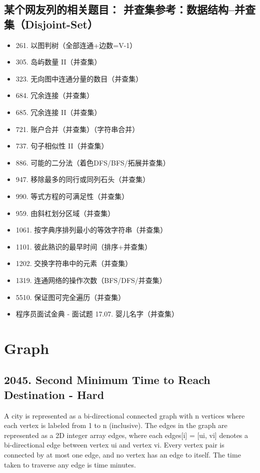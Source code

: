 \documentclass[9pt, b5paaper]{book}
\begin{document}
\section{某个网友列的相关题目： 并查集参考：数据结构–并查集（Disjoint-Set）}
\label{sec-6-9}
\begin{itemize}
\item 261. 以图判树（全部连通+边数=V-1）
\item 305. 岛屿数量 II（并查集）
\item 323. 无向图中连通分量的数目（并查集）
\item 684. 冗余连接（并查集）
\item 685. 冗余连接 II（并查集）
\item 721. 账户合并（并查集）（字符串合并）
\item 737. 句子相似性 II（并查集）
\item 886. 可能的二分法（着色DFS/BFS/拓展并查集）
\item 947. 移除最多的同行或同列石头（并查集）
\item 990. 等式方程的可满足性（并查集）
\item 959. 由斜杠划分区域（并查集）
\item 1061. 按字典序排列最小的等效字符串（并查集）
\item 1101. 彼此熟识的最早时间（排序+并查集）
\item 1202. 交换字符串中的元素（并查集）
\item 1319. 连通网络的操作次数（BFS/DFS/并查集）
\item 5510. 保证图可完全遍历（并查集）
\item 程序员面试金典 - 面试题 17.07. 婴儿名字（并查集）
\end{itemize}


\chapter{Graph}
\label{sec-7}
\section{2045. Second Minimum Time to Reach Destination - Hard}
\label{sec-7-1}
A city is represented as a bi-directional connected graph with n vertices where each vertex is labeled from 1 to n (inclusive). The edges in the graph are represented as a 2D integer array edges, where each edges[i] = [ui, vi] denotes a bi-directional edge between vertex ui and vertex vi. Every vertex pair is connected by at most one edge, and no vertex has an edge to itself. The time taken to traverse any edge is time minutes.
\end{document}
